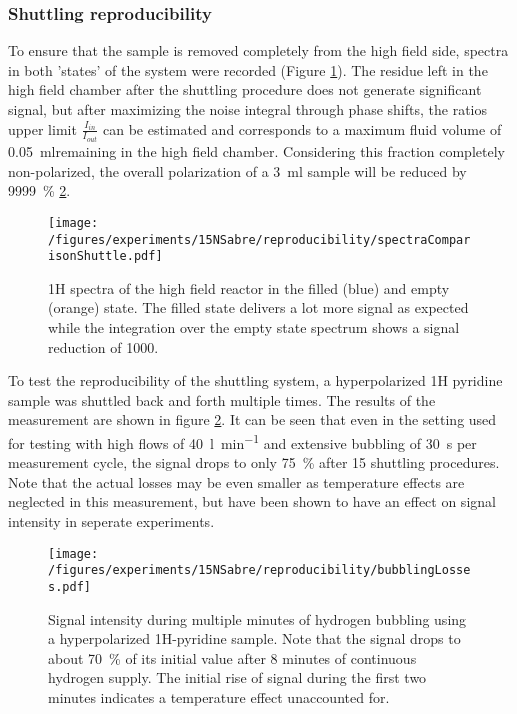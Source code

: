         \subsubsection{Shuttling reproducibility}
            \label{results:15N:shuttlingReproducibility}
            To ensure that the sample is removed completely from the high field side, spectra in both 'states' of the system were recorded (Figure \ref{fig:results:15N:shuttlingRemoval}). The residue left in the high field chamber after the shuttling procedure does not generate significant signal, but after maximizing the noise integral through phase shifts, the ratios upper limit $\frac{I_{in}}{I_{out}}$ can be estimated and corresponds to a maximum fluid volume of \SI{0.05}{ml}remaining in the high field chamber. Considering this fraction completely non-polarized, the overall polarization of a \SI{3}{ml} sample will be reduced by \SI{9999}{\percent} \ref{fig:results:15N:shuttlingReproducibility}.
            \begin{figure}
                \centering
                \texttt{[image: /figures/experiments/15NSabre/reproducibility/spectraComparisonShuttle.pdf]}
                \caption[High field removal efficiency]{1H spectra of the high field reactor in the filled (blue) and empty (orange) state. The filled state delivers a lot more signal as expected while the integration over the empty state spectrum shows a signal reduction of 1000.}
                \label{fig:results:15N:shuttlingRemoval}
            \end{figure}
            To test the reproducibility of the shuttling system, a hyperpolarized 1H pyridine sample was shuttled back and forth multiple times. The results of the measurement are shown in figure \ref{fig:results:15N:shuttlingReproducibility}. It can be seen that even in the setting used for testing with high flows of \SI{40}{\litre\per\minute} and extensive bubbling of \SI{30}{\second} per measurement cycle, the signal drops to only \SI{75}{\percent} after 15 shuttling procedures. Note that the actual losses may be even smaller as temperature effects are neglected in this measurement, but have been shown to have an effect on signal intensity in seperate experiments.
            \begin{figure}
                \label{fig:results:15N:shuttlingReproducibility}
                \centering
                \texttt{[image: /figures/experiments/15NSabre/reproducibility/bubblingLosses.pdf]}
                \caption[Bubbling fluid losses]{Signal intensity during multiple minutes of hydrogen bubbling using a hyperpolarized 1H-pyridine sample. Note that the signal drops to about \SI{70}{\percent} of its initial value after 8 minutes of continuous hydrogen supply. The initial rise of signal during the first two minutes indicates a temperature effect unaccounted for.}
            \end{figure}
